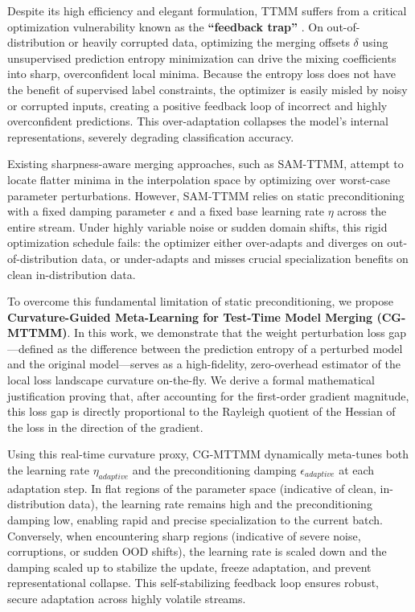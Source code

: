 \documentclass{article}
\theoremstyle{plain}
\theoremstyle{definition}
\theoremstyle{remark}
\begin{document}
Despite its high efficiency and elegant formulation, TTMM suffers from a critical optimization vulnerability known as the \textbf{``feedback trap''} \cite{sam_ttmm}. On out-of-distribution or heavily corrupted data, optimizing the merging offsets $\delta$ using unsupervised prediction entropy minimization can drive the mixing coefficients into sharp, overconfident local minima. Because the entropy loss does not have the benefit of supervised label constraints, the optimizer is easily misled by noisy or corrupted inputs, creating a positive feedback loop of incorrect and highly overconfident predictions. This over-adaptation collapses the model's internal representations, severely degrading classification accuracy. 

Existing sharpness-aware merging approaches, such as SAM-TTMM, attempt to locate flatter minima in the interpolation space by optimizing over worst-case parameter perturbations. However, SAM-TTMM relies on static preconditioning with a fixed damping parameter $\epsilon$ and a fixed base learning rate $\eta$ across the entire stream. Under highly variable noise or sudden domain shifts, this rigid optimization schedule fails: the optimizer either over-adapts and diverges on out-of-distribution data, or under-adapts and misses crucial specialization benefits on clean in-distribution data.

To overcome this fundamental limitation of static preconditioning, we propose \textbf{Curvature-Guided Meta-Learning for Test-Time Model Merging (CG-MTTMM)}. In this work, we demonstrate that the weight perturbation loss gap---defined as the difference between the prediction entropy of a perturbed model and the original model---serves as a high-fidelity, zero-overhead estimator of the local loss landscape curvature on-the-fly. We derive a formal mathematical justification proving that, after accounting for the first-order gradient magnitude, this loss gap is directly proportional to the Rayleigh quotient of the Hessian of the loss in the direction of the gradient. 

Using this real-time curvature proxy, CG-MTTMM dynamically meta-tunes both the learning rate $\eta_{adaptive}$ and the preconditioning damping $\epsilon_{adaptive}$ at each adaptation step. In flat regions of the parameter space (indicative of clean, in-distribution data), the learning rate remains high and the preconditioning damping low, enabling rapid and precise specialization to the current batch. Conversely, when encountering sharp regions (indicative of severe noise, corruptions, or sudden OOD shifts), the learning rate is scaled down and the damping scaled up to stabilize the update, freeze adaptation, and prevent representational collapse. This self-stabilizing feedback loop ensures robust, secure adaptation across highly volatile streams.
\end{document}
